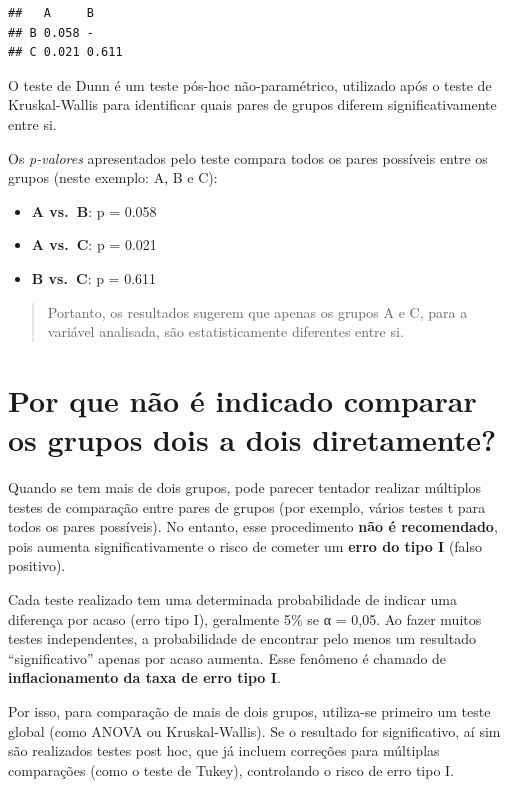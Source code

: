 \documentclass[
]{book}
\providecommand{\tightlist}{%
  \setlength{\itemsep}{0pt}\setlength{\parskip}{0pt}}
\begin{document}
\begin{verbatim}
##   A     B    
## B 0.058 -    
## C 0.021 0.611
\end{verbatim}

O teste de Dunn é um teste pós-hoc não-paramétrico, utilizado após o teste de Kruskal-Wallis para identificar quais pares de grupos diferem significativamente entre si.

Os \emph{p-valores} apresentados pelo teste compara todos os pares possíveis entre os grupos (neste exemplo: A, B e C):

\begin{itemize}
\tightlist
\item
  \textbf{A vs.~B}: p = 0.058
\item
  \textbf{A vs.~C}: p = 0.021
\item
  \textbf{B vs.~C}: p = 0.611
\end{itemize}

\begin{quote}
Portanto, os resultados sugerem que apenas os grupos A e C, para a variável analisada, são estatisticamente diferentes entre si.
\end{quote}

\section{Por que não é indicado comparar os grupos dois a dois diretamente?}\label{por-que-nuxe3o-uxe9-indicado-comparar-os-grupos-dois-a-dois-diretamente}

Quando se tem mais de dois grupos, pode parecer tentador realizar múltiplos testes de comparação entre pares de grupos (por exemplo, vários testes t para todos os pares possíveis). No entanto, esse procedimento \textbf{não é recomendado}, pois aumenta significativamente o risco de cometer um \textbf{erro do tipo I} (falso positivo).

Cada teste realizado tem uma determinada probabilidade de indicar uma diferença por acaso (erro tipo I), geralmente 5\% se α = 0,05. Ao fazer muitos testes independentes, a probabilidade de encontrar pelo menos um resultado ``significativo'' apenas por acaso aumenta. Esse fenômeno é chamado de \textbf{inflacionamento da taxa de erro tipo I}.

Por isso, para comparação de mais de dois grupos, utiliza-se primeiro um teste global (como ANOVA ou Kruskal-Wallis). Se o resultado for significativo, aí sim são realizados testes post hoc, que já incluem correções para múltiplas comparações (como o teste de Tukey), controlando o risco de erro tipo I.
\end{document}
